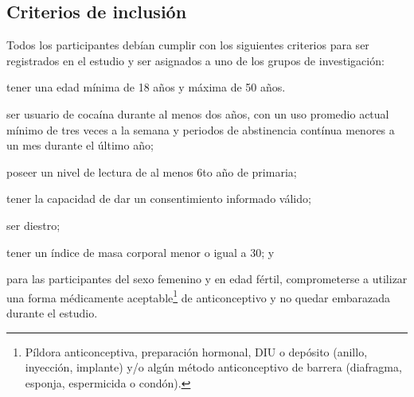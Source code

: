 \subsection{Criterios de inclusión}
Todos los participantes debían cumplir con los siguientes criterios para ser registrados en el estudio y ser asignados a uno de los grupos de investigación:
\begin{enumerate*}[label=\emph{\alph*})]
    \item tener una edad mínima de 18 años y máxima de 50 años.
    \item ser usuario de cocaína durante al menos dos  años, con un uso promedio actual mínimo de tres veces a la semana y periodos de abstinencia contínua menores a un mes durante el último año;
    \item poseer un nivel de lectura de al menos 6to año de primaria;
    \item tener la capacidad de dar un consentimiento informado válido;
    \item ser diestro;
    \item tener un índice de masa corporal menor o igual a 30; y
    \item para las participantes del sexo femenino y en edad fértil, comprometerse a utilizar una forma médicamente aceptable\footnote{Píldora anticonceptiva, preparación hormonal, DIU o depósito (anillo, inyección, implante) y/o algún método anticonceptivo de barrera (diafragma, esponja, espermicida o condón).} de anticonceptivo y no quedar embarazada durante el estudio.
\end{enumerate*}

